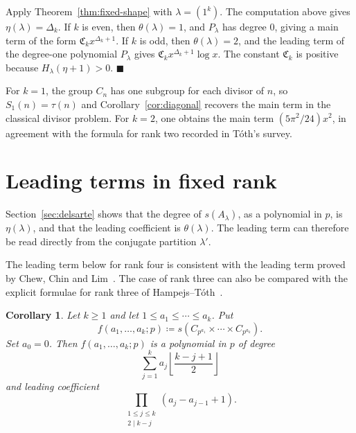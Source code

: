 \documentclass[a4paper,11pt,reqno]{amsart}
\theoremstyle{plain}
\newtheorem{corollary}[theorem]{Corollary}
\theoremstyle{remark}
\numberwithin{equation}{section}
\renewcommand{\leq}{\leqslant}
\renewcommand{\geq}{\geqslant}
\newenvironment{proofof}{{\bf Proof. }}{\hfill $\blacksquare$ \\}
\begin{document}
\begin{proofof}
Apply Theorem~\ref{thm:fixed-shape} with $\lambda=(1^k)$. The computation
above gives $\eta(\lambda)=\Delta_k$. If $k$ is even, then
$\theta(\lambda)=1$, and $P_\lambda$ has degree $0$, giving a main term of the
form $\mathfrak{C}_k x^{\Delta_k+1}$. If $k$ is odd, then
$\theta(\lambda)=2$, and the leading term of the degree-one polynomial
$P_\lambda$ gives
$\mathfrak{C}_k x^{\Delta_k+1}\log x$. The constant $\mathfrak{C}_k$ is
positive because $H_\lambda(\eta+1)>0$.
\end{proofof}

For $k=1$, the group $C_n$ has one subgroup for each divisor of $n$, so
$S_1(n)=\tau(n)$ and Corollary~\ref{cor:diagonal} recovers the main term in the
classical divisor problem. For $k=2$, one obtains the main term
$(5\pi^2/24)x^2$, in agreement with the formula for rank two recorded in T\'oth's
survey.

\section{Leading terms in fixed rank}
\label{sec:fixed-rank}

Section~\ref{sec:delsarte} shows that the degree of $s(A_\lambda)$, as a
polynomial in $p$, is $\eta(\lambda)$, and that the leading coefficient is
$\theta(\lambda)$. The leading term can therefore be read
directly from the conjugate partition $\lambda'$.

The leading term below for rank four is consistent with the leading term proved
by Chew, Chin and Lim~\cite[Cor.~4.4]{ChewChinLim}. The case of rank three
can also be compared with the explicit formulae for rank three of
Hampejs--T\'oth~\cite{HampejsTothRankThree}.

\begin{corollary}\label{cor:fixed-rank-leading-term}
Let $k\geq 1$ and let $1\leq a_1\leq\cdots\leq a_k$. Put
\[
        f(a_1,\ldots,a_k;p)
        \coloneqq
        s(C_{p^{a_1}}\times\cdots\times C_{p^{a_k}}).
\]
Set $a_0=0$. Then $f(a_1,\ldots,a_k;p)$ is a polynomial in $p$ of degree
\[
        \sum_{j=1}^k a_j\left\lfloor\frac{k-j+1}{2}\right\rfloor
\]
and leading coefficient
\[
        \prod_{\substack{1\leq j\leq k\\ 2\mid k-j}}
        (a_j-a_{j-1}+1).
\]
\end{corollary}
\end{document}
